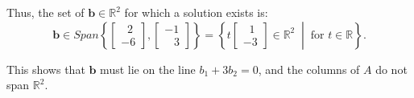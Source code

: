 \documentclass[a4paper,11pt,reqno]{amsart}
\numberwithin{equation}{section}
\begin{document}
\begin{enumerate}
\begin{center}
{{Thus, the set of \( \mathbf{b}\in \mathbb{R}^2\) for which a solution exists is:
   \[
   \mathbf{b} \in Span\left\{
   \begin{bmatrix}
   \;\;2 \\
   -6
   \end{bmatrix}
   ,
   \begin{bmatrix}
   -1 \\
   \;\;\;3
   \end{bmatrix}
   \right\}
   = 
   \left\{
   t\begin{bmatrix}
   \;\;1 \\
   -3
   \end{bmatrix}
   \in \mathbb{R}^2 \;\middle|\; \text{for } t\in\mathbb{R}
   \right\}.
   \]

This shows that \( \mathbf{b} \) must lie on the line \( b_1 + 3b_2 = 0 \), and the columns of \( A \) do not span \( \mathbb{R}^2 \).

}}
\end{center}
\end{enumerate}
\end{document}
